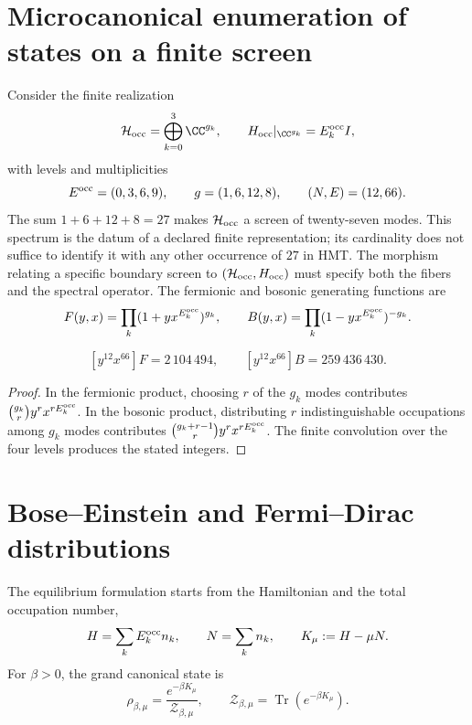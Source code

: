 \section{Microcanonical enumeration of states on a finite screen}

Consider the finite realization
\[
 \mathcal H_{\rm occ}=\bigoplus_{k=0}^{3}\CC^{g_k},
 \qquad
 H_{\rm occ}|_{\CC^{g_k}}=E_k^{\rm occ} I,
\]
with levels and multiplicities
\[
 E^{\rm occ}=(0,3,6,9),\qquad g=(1,6,12,8),
 \qquad(N,E)=(12,66).
\]
The sum \(1+6+12+8=27\) makes \(\mathcal H_{\rm occ}\) a screen of
twenty-seven modes. This spectrum is the datum of a declared finite
representation; its cardinality does not suffice to identify it with any other
occurrence of \(27\) in HMT\@. The morphism relating a specific
boundary screen to \((\mathcal H_{\rm occ},H_{\rm occ})\) must specify both
the fibers and the spectral operator.
The fermionic and bosonic generating functions are
\[
 F(y,x)=\prod_k(1+yx^{E_k^{\rm occ}})^{g_k},
 \qquad
 B(y,x)=\prod_k(1-yx^{E_k^{\rm occ}})^{-g_k}.
\]

\begin{proposition}
\label{prop:cardinalidades-microcanonicas}
\[
 [y^{12}x^{66}]F=2\,104\,494,
 \qquad
 [y^{12}x^{66}]B=259\,436\,430.
\]
\end{proposition}
\begin{proof}
In the fermionic product, choosing \(r\) of the \(g_k\) modes contributes
\(\binom{g_k}{r}y^rx^{rE_k^{\rm occ}}\). In the bosonic product, distributing \(r\)
indistinguishable occupations among \(g_k\) modes contributes
\(\binom{g_k+r-1}{r}y^rx^{rE_k^{\rm occ}}\). The finite convolution over the
four levels produces the stated integers.
\end{proof}

\section{Bose--Einstein and Fermi--Dirac distributions}

The equilibrium formulation starts from the Hamiltonian and the total
occupation number,
\begin{equation}
 H=\sum_kE_k^{\rm occ} n_k,
 \qquad
 N=\sum_k n_k,
 \qquad
 K_\mu:=H-\mu N.
 \label{eq:hamiltoniano-gran-canonico-rev3}
\end{equation}
For \(\beta>0\), the grand canonical state is
\begin{equation}
 \rho_{\beta,\mu}
 =\frac{e^{-\beta K_\mu}}{\mathcal Z_{\beta,\mu}},
 \qquad
 \mathcal Z_{\beta,\mu}
 =\operatorname{Tr}(e^{-\beta K_\mu}).
 \label{eq:estado-gran-canonico-rev3}
\end{equation}

